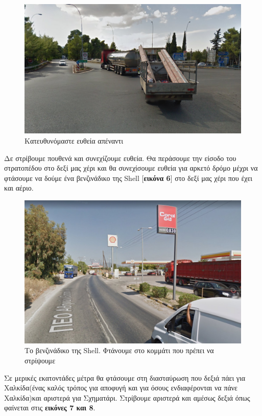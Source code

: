 \begin{figure}[hbp!]
	\centering
		\includegraphics[width=\textwidth]{images/athina-lamia/astefanos/astefanos4.PNG}
			\caption{Κατευθυνόμαστε ευθεία απέναντι}
\end{figure}
\break
Δε στρίβουμε πουθενά και συνεχίζουμε ευθεία. Θα περάσουμε την είσοδο του στρατοπέδου στο δεξί μας χέρι και θα συνεχίσουμε ευθεία για αρκετό δρόμο μέχρι να φτάσουμε να δούμε ένα βενζινάδικο της Shell  [\textbf{εικόνα 6}] στο δεξί μας χέρι που έχει και αέριο. 
\begin{figure}[hbp!]
	\centering
		\includegraphics[width=\textwidth]{images/athina-lamia/astefanos/astefanos5.PNG}
			\caption{Το βενζινάδικο της Shell. Φτάνουμε στο κομμάτι που πρέπει να στρίψουμε}
\end{figure}

\break
Σε μερικές εκατοντάδες μέτρα θα φτάσουμε στη διασταύρωση που δεξιά πάει για Χαλκίδα(ένας καλός τρόπος για αποφυγή και για όσους ενδιαφέρονται να πάνε Χαλκίδα)και αριστερά για Σχηματάρι. Στρίβουμε αριστερά  και αμέσως δεξιά όπως φαίνεται στις \textbf{εικόνες 7 και 8}.

